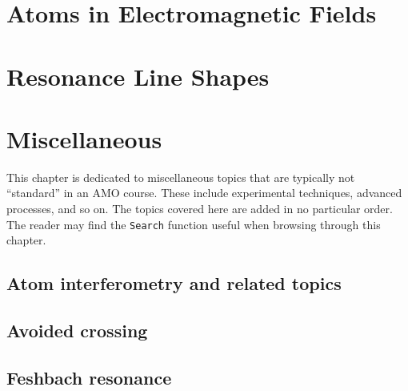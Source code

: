\documentclass{book}
\theoremstyle{definition}
\begin{document}





\chapter{Atoms in Electromagnetic Fields}














\chapter{Resonance Line Shapes}










\chapter{Miscellaneous}

This chapter is dedicated to miscellaneous topics that are typically not ``standard'' in an AMO course. These include experimental techniques, advanced processes, and so on. The topics covered here are added in no particular order. The reader may find the \texttt{Search} function useful when browsing through this chapter. 

\section{Atom interferometry and related topics}

\section{Avoided crossing}

\section{Feshbach resonance}











 




	
	
\end{document}
